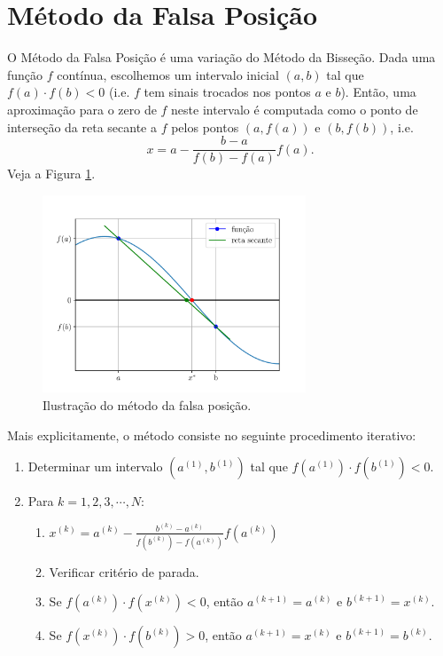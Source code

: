 \section{Método da Falsa Posição}\label{cap_eq1d_sec_falsapos}

O Método da Falsa Posição é uma variação do Método da Bisseção. Dada uma função $f$ contínua, escolhemos um intervalo inicial $(a, b)$ tal que $f(a)\cdot f(b) < 0$ (i.e. $f$ tem sinais trocados nos pontos $a$ e $b$). Então, uma aproximação para o zero de $f$ neste intervalo é computada como o ponto de interseção da reta secante a $f$ pelos pontos $(a, f(a))$ e $(b, f(b))$, i.e.
\begin{equation}
  x = a - \frac{b-a}{f(b)-f(a)}f(a).
\end{equation}
Veja a Figura \ref{cap_eq1d_sec_falsapos:fig:falsapos}.

\begin{figure}[H]
  \centering
  \includegraphics[width=0.7\textwidth]{./cap_eq1d/dados/fig_falsapos/fig}
  \caption{Ilustração do método da falsa posição.}
  \label{cap_eq1d_sec_falsapos:fig:falsapos}
\end{figure}

Mais explicitamente, o método consiste no seguinte procedimento iterativo:
\begin{enumerate}
\item Determinar um intervalo $(a^{(1)}, b^{(1)})$ tal que $f(a^{(1)})\cdot f(b^{(1)}) < 0$.
\item Para $k = 1, 2, 3, \cdots, N$:
  \begin{enumerate}[2.1]
  \item $\displaystyle x^{(k)} = a^{(k)} - \frac{b^{(k)}-a^{(k)}}{f(b^{(k)})-f(a^{(k)})}f(a^{(k)})$
  \item Verificar critério de parada.
  \item Se $f(a^{(k)})\cdot f(x^{(k)}) < 0$, então $a^{(k+1)}=a^{(k)}$ e $b^{(k+1)}=x^{(k)}$.
  \item Se $f(x^{(k)})\cdot f(b^{(k)}) > 0$, então $a^{(k+1)}=x^{(k)}$ e $b^{(k+1)}=b^{(k)}$.
  \end{enumerate}
\end{enumerate}


